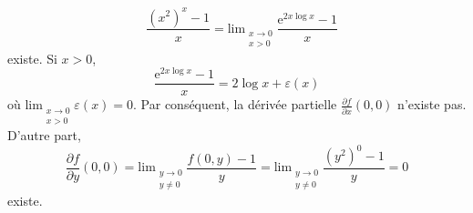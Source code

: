 {\begin{enumerate}
{\[{\begin{smallmatrix}
\end{smallmatrix}}\frac {(x^2)^x-1}x = 
\mathrm{lim}_{\begin{smallmatrix} x \to 0\\ x > 0
\end{smallmatrix}}\frac {\mathrm e^{2x \log x} -1}x
\]
existe. Si $x>0$,
\[
\frac {\mathrm e^{2x \log x} -1}x = 2 \log x + \varepsilon(x)
\]
o\`u $\mathrm{lim}_{\begin{smallmatrix} x \to 0\\ x > 0
\end{smallmatrix}}\varepsilon(x)=0$. Par cons\'equent,
 la d\'eriv\'ee partielle
$\frac{\partial f}{\partial x}(0,0)$ n'existe pas.
D'autre part,
\[
\frac{\partial f}{\partial y}(0,0)=
\mathrm{lim}_{\begin{smallmatrix} y \to 0\\ y \ne 0
\end{smallmatrix}}\frac {f(0,y) -1}y =
\mathrm{lim}_{\begin{smallmatrix} y \to 0\\ y \ne 0
\end{smallmatrix}}\frac {(y^2)^0-1}y = 0
\]
existe.}
\end{enumerate}
}
